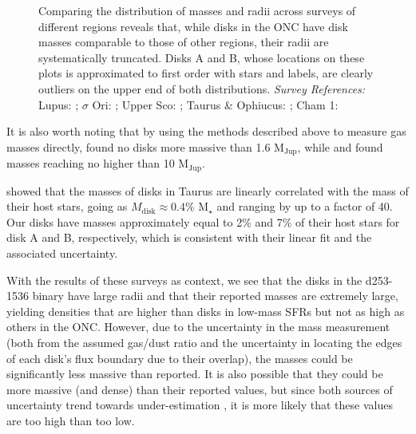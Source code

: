 \begin{figure}[h!]
  \centering
    \hspace*{\fill}%
    \hspace*{\fill}%
    \caption{Comparing the distribution of masses and radii across surveys of different regions \citep{Eisner2018} reveals that, while disks in the ONC have disk masses comparable to those of other regions, their radii are systematically truncated. Disks A and B, whose locations on these plots is approximated to first order with stars and labels, are clearly outliers on the upper end of both distributions. \textit{Survey References:} Lupus: \citet{Tazzari2017}; $\sigma$ Ori: \citet{Ansdell2017}; Upper Sco: \citet{Barenfeld2017}; Taurus \& Ophiucus: \citet{Tripathi2017}; Cham 1: \citet{Pascucci2016}}
    \label{fig:eisner18_disk_properties}
\end{figure}


It is also worth noting that by using the methods described above to measure gas masses directly, \citet{Miotello2017} found no disks more massive than 1.6 M$_\text{Jup}$, while \citet{Ansdell2016} and \citet{Ansdell2018} found masses reaching no higher than 10 M$_\text{Jup}$.

\citet{Andrews2013} showed that the masses of disks in Taurus are linearly correlated with the mass of their host stars, going as $M_\text{disk} \approx 0.4$\% M$_\star$ and ranging by up to a factor of 40. Our disks have masses approximately equal to 2\% and 7\% of their host stars for disk A and B, respectively, which is consistent with their linear fit and the associated uncertainty.

With the results of these surveys as context, we see that the disks in the d253-1536 binary have large radii and that their reported masses are extremely large, yielding densities that are higher than disks in low-mass SFRs but not as high as others in the ONC. However, due to the uncertainty in the mass measurement (both from the assumed gas/dust ratio and the uncertainty in locating the edges of each disk's flux boundary due to their overlap), the masses could be significantly less massive than reported. It is also possible that they could be more massive (and dense) than their reported values, but since both sources of uncertainty trend towards under-estimation \citep[][showed that disks in Lupus were better represented by a 10:1 gas/dust ratio, and, as discussed in \S\ref{chap:results}, the integrated flux measurement that yields the disks' dust masses is likely over-counting emission]{Miotello2017}, it is more likely that these values are too high than too low.






